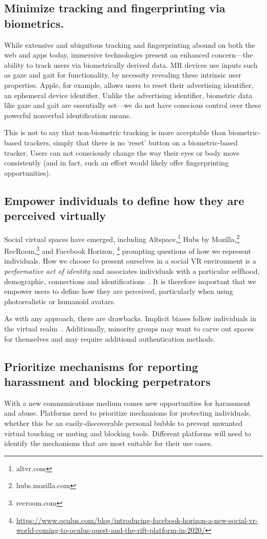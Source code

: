 \subsection{Minimize tracking and fingerprinting via biometrics.}
While extensive and ubiquitous tracking and fingerprinting abound on both the web and apps today, immersive technologies present an enhanced concern---the ability to track users via biometrically derived data. MR devices use inputs such as gaze and gait for functionality, by necessity revealing these intrinsic user properties. Apple, for example, allows users to reset their advertising identifier, an ephemeral device identifier. Unlike the advertising identifier, biometric data like gaze and gait are essentially set---we do not have conscious control over these powerful nonverbal identification means.	

This is not to say that non-biometric tracking is more acceptable than biometric-based trackers, simply that there is no `reset' button on a biometric-based tracker. Users can not consciously change the way their eyes or body move consistently (and in fact, such an effort would likely offer fingerprinting opportunities).

\subsection{Empower individuals to define how they are perceived virtually}
Social virtual spaces have emerged, including Altspace,\footnote{altvr.com} Hubs by Mozilla,\footnote{hubs.mozilla.com} RecRoom,\footnote{recroom.com} and Facebook Horizon,
\footnote{\url{https://www.oculus.com/blog/introducing-facebook-horizon-a-new-social-vr-world-coming-to-oculus-quest-and-the-rift-platform-in-2020/}}
 prompting questions of how we represent individuals. How we choose to present ourselves in a social VR environment is a \emph{performative act of identity} and associates individuals with a particular selfhood, demographic, connections and identifications~\cite{cover2012performing}. It is therefore important that we empower users to define how they are perceived, particularly when using photorealistic or humanoid avatars.

As with any approach, there are drawbacks. Implicit biases follow individuals in the virtual realm~\cite{maloney}. Additionally, minority groups may want to carve out spaces for themselves and may require additional authentication methods.


\subsection{Prioritize mechanisms for reporting harassment and blocking perpetrators}
With a new communications medium comes new opportunities for harassment and abuse. Platforms need to prioritize mechanisms for protecting individuals, whether this be an easily-discoverable personal bubble to prevent unwanted virtual touching or muting and blocking tools. Different platforms will need to identify the mechanisms that are most suitable for their use cases. 

